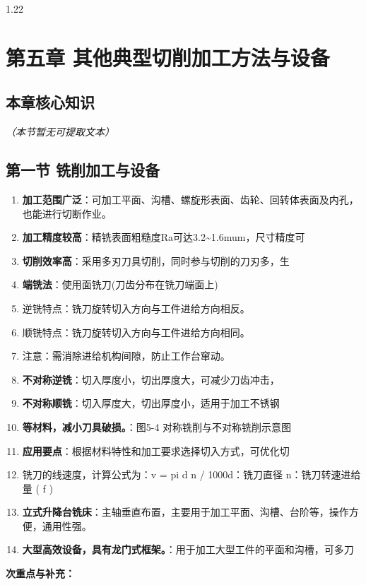 \documentclass[12pt,a4paper]{article}
\begin{document}
\begin{spacing}{1.22}
\section{第五章 其他典型切削加工方法与设备}
\subsection{本章核心知识}
\textit{（本节暂无可提取文本）}

\subsection{第一节 铣削加工与设备}
\begin{tcolorbox}[colback=yellow!6,colframe=red!55!black,title=重点,left=1mm,right=1mm]
\begin{enumerate}[leftmargin=2.2em,label=\arabic*.]
  \item \textbf{加工范围广泛}：可加工平面、沟槽、螺旋形表面、齿轮、回转体表面及内孔，也能进行切断作业。
  \item \textbf{加工精度较高}：精铣表面粗糙度Ra可达3.2\textasciitilde{}1.6mum，尺寸精度可
  \item \textbf{切削效率高}：采用多刃刀具切削，同时参与切削的刀刃多，生
  \item \textbf{端铣法}：使用面铣刀(刀齿分布在铣刀端面上)
  \item 逆铣特点：铣刀旋转切入方向与工件进给方向相反。
  \item 顺铣特点：铣刀旋转切入方向与工件进给方向相同。
  \item 注意：需消除进给机构间隙，防止工作台窜动。
  \item \textbf{不对称逆铣}：切入厚度小，切出厚度大，可减少刀齿冲击，
  \item \textbf{不对称顺铣}：切入厚度大，切出厚度小，适用于加工不锈钢
  \item \textbf{等材料，减小刀具破损。}：图5-4 对称铣削与不对称铣削示意图
  \item \textbf{应用要点}：根据材料特性和加工要求选择切入方式，可优化切
  \item 铣刀的线速度，计算公式为：v = pi d n / 1000d：铣刀直径 n：铣刀转速进给量 ( f )
  \item \textbf{立式升降台铣床}：主轴垂直布置，主要用于加工平面、沟槽、台阶等，操作方便，通用性强。
  \item \textbf{大型高效设备，具有龙门式框架。}：用于加工大型工件的平面和沟槽，可多刀
\end{enumerate}
\end{tcolorbox}
\noindent\textbf{次重点与补充：}

\end{spacing}
\end{document}
